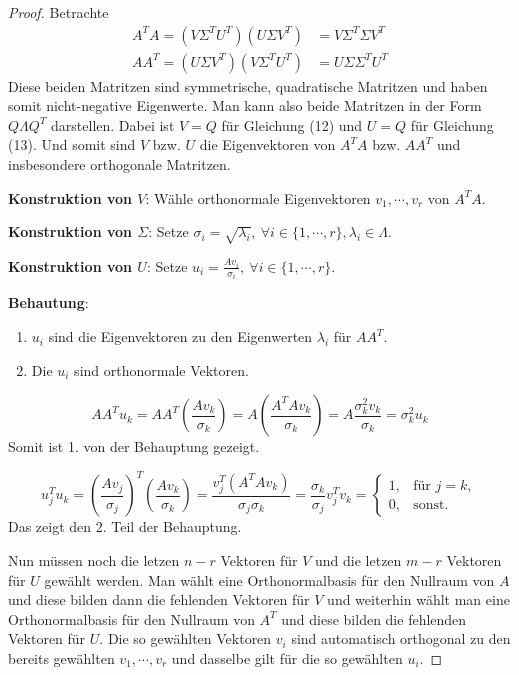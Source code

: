 \documentclass{article}
\begin{document}
\begin{proof} \cite[S. 56f., 58f.]{strang2019linear}
    Betrachte
    \begin{align}
        A^TA = (V \Sigma^T U^T) (U \Sigma V^T) &= V \Sigma^T \Sigma V^T \\
        AA^T = (U \Sigma V^T) (V \Sigma^T U^T) &= U \Sigma \Sigma^T U^T
    \end{align}
    Diese beiden Matritzen sind symmetrische, quadratische Matritzen und haben somit
    nicht-negative Eigenwerte. Man kann also beide Matritzen in der Form $Q \Lambda Q^T$ darstellen.
    Dabei ist $V = Q$ für Gleichung (12) und $U = Q$ für Gleichung (13). Und somit sind $V$ bzw. $U$ die Eigenvektoren
    von $A^TA$ bzw. $AA^T$ und insbesondere orthogonale Matritzen.

    \textbf{Konstruktion von $V$}: Wähle orthonormale Eigenvektoren $v_1, \cdots, v_r$ von $A^TA$.

    \textbf{Konstruktion von $\Sigma$}: Setze $\sigma_i = \sqrt{\lambda_i}, \: \forall i \in \{1, \cdots, r\}, \lambda_i \in \Lambda$.

    \textbf{Konstruktion von $U$}: Setze $u_i = \frac{Av_i}{\sigma_i}, \: \forall i \in \{1, \cdots, r\}$.
    
    \textbf{Behautung}: 
    \begin{enumerate}
        \item $u_i$ sind die Eigenvektoren zu den Eigenwerten $\lambda_i$ für $AA^T$.
        \item Die $u_i$ sind orthonormale Vektoren.
    \end{enumerate}
    \begin{equation*}
        AA^Tu_k = AA^T\left(\frac{Av_k}{\sigma_k}\right) = A\left(\frac{A^TAv_k}{\sigma_k}\right) = A\frac{\sigma_k^2v_k}{\sigma_k} = \sigma_k^2u_k
    \end{equation*}
    Somit ist 1. von der Behauptung gezeigt.

    \begin{equation*}
        u_j^Tu_k = \left(\frac{Av_j}{\sigma_j}\right)^T\left(\frac{Av_k}{\sigma_k}\right) = \frac{v_j^T(A^TAv_k)}{\sigma_j\sigma_k} = \frac{\sigma_k}{\sigma_j}v_j^Tv_k = \begin{cases}
            1, &\text{für } j = k,\\
            0, &\text{sonst}.
        \end{cases}
    \end{equation*}
    Das zeigt den 2. Teil der Behauptung.

    Nun müssen noch die letzen $n - r$ Vektoren für $V$ und die letzen $m - r$ Vektoren für $U$ gewählt werden.
    Man wählt eine Orthonormalbasis für den Nullraum von $A$ und diese bilden dann die fehlenden Vektoren für $V$ 
    und weiterhin wählt man eine Orthonormalbasis für den Nullraum von $A^T$ und diese bilden die fehlenden Vektoren für $U$.
    Die so gewählten Vektoren $v_i$ sind automatisch orthogonal zu den bereits gewählten $v_1, \cdots, v_r$ 
    und dasselbe gilt für die so gewählten $u_i$. 
\end{proof}
\end{document}
